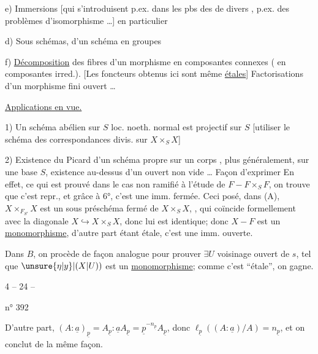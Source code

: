 e) Immersions [qui s'introduisent p.ex. dans les pbs des  de divers , p.ex. des problèmes d'isomorphisme \ldots] en particulier 

d) Sous  schémas,  d'un schéma en groupes 

f) \uline{Décomposition} des fibres  d'un morphisme en composantes connexes ( en composantes irred.).
[Les foncteurs obtenus ici sont même \uline{étales}]
Factorisations d'un morphisme fini  ouvert \ldots

\uline{Applications en vue.}

1) Un schéma abélien sur $S$ loc. noeth. normal est projectif sur $S$
[utiliser le schéma des correspondances divis. sur $X\times_S X$]

2) Existence du Picard d'un schéma propre sur un corps \deleted{[\unsure{Seshadri M.}} , plus généralement, sur une base $S$, existence au-dessus d'un ouvert non vide \ldots
{}
Façon d'exprimer
En effet,  ce qui est prouvé dans le cas non ramifié à l'étude de $F\mathbin{-}F\times_S F$, on trouve que c'est repr., et grâce à 6°, c'est une imm. fermée. Ceci posé, dans (A), $X\times_{F_{S'}}X$ est un sous préschéma fermé de $X\times_S X$, , qui coïncide formellement avec la diagonale $X\hookrightarrow X\times_S X$, donc lui est identique; donc $X\mathbin{-}F$ est un \uline{monomorphisme}, d'autre part étant étale, c'est une imm. ouverte.

Dans $B$, on procède de façon analogue pour prouver $\exists U$ voisinage ouvert de $s$, tel que $\unsure{\eta|y}|(X|U))$ est un \uline{monomorphisme}; comme c'est   ``étale'', on gagne.
\begin{center}4 -- 24 --\end{center}
\hfill n° 392

D'autre part, $(A:\underline a)_{\underline p}=A_{\underline p}:\underline a A_{\underline p}=\underline p^{-n_{\underline p}}A_{\underline p}$, donc $\ell_{\underline p}((A:\underline a)/A)=n_{\underline p}$, et on conclut de la même façon.


